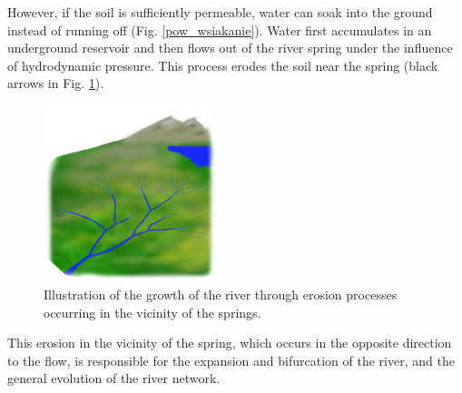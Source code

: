 \documentclass[]{pracamgr}
\begin{document}
    However, if the soil is sufficiently permeable, water can soak into the ground instead of running off (Fig. \ref{pow_wsiakanie}). Water first accumulates in an underground reservoir and then flows out of the river spring under the influence of hydrodynamic pressure. This process erodes the soil near the spring (black arrows in Fig. \ref{zrodlo}).

    \begin{figure}
      \begin{center}
        \vspace{-20pt}
        \includegraphics[width=0.45\textwidth]{figs/erosion_illustration.jpg}
      \end{center}
      \vspace{-20pt}
      \caption{Illustration of the growth of the river through erosion processes occurring in the vicinity of the springs.}
      \vspace{0pt}
      \label{zrodlo}
    \end{figure}

    This erosion in the vicinity of the spring, which occurs in the opposite direction to the flow, is responsible for the expansion and bifurcation of the river, and the general evolution of the river network.
\end{document}
